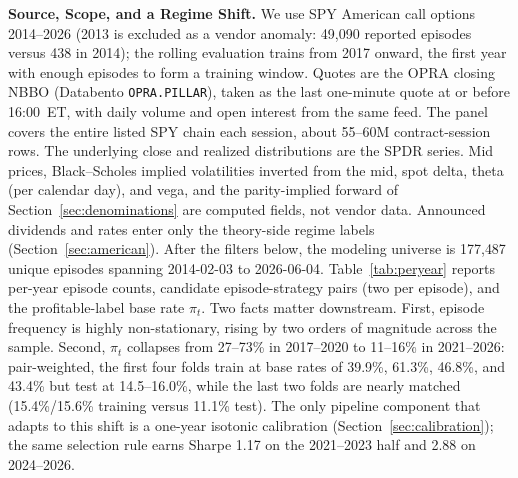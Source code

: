 \documentclass[sigconf,review,anonymous]{acmart}
\begin{document}
\medskip\noindent\textbf{Source, Scope, and a Regime Shift.}
\label{sec:data-source}
We use SPY American call options 2014--2026 (2013 is excluded as a vendor anomaly: 49{,}090 reported episodes versus 438 in 2014); the rolling evaluation trains from 2017 onward, the first year with enough episodes to form a training window. Quotes are the OPRA closing NBBO (Databento \texttt{OPRA.PILLAR}), taken as the last one-minute quote at or before 16:00~ET, with daily volume and open interest from the same feed. The panel covers the entire listed SPY chain each session, about 55--60M contract-session rows. The underlying close and realized distributions are the SPDR series. Mid prices, Black--Scholes implied volatilities inverted from the mid, spot delta, theta (per calendar day), and vega, and the parity-implied forward of Section~\ref{sec:denominations} are computed fields, not vendor data. Announced dividends and rates enter only the theory-side regime labels (Section~\ref{sec:american}). After the filters below, the modeling universe is 177{,}487 unique episodes spanning 2014-02-03 to 2026-06-04. Table~\ref{tab:peryear} reports per-year episode counts, candidate episode-strategy pairs (two per episode), and the profitable-label base rate $\pi_t$. Two facts matter downstream. First, episode frequency is highly non-stationary, rising by two orders of magnitude across the sample. Second, $\pi_t$ collapses from 27--73\% in 2017--2020 to 11--16\% in 2021--2026: pair-weighted, the first four folds train at base rates of 39.9\%, 61.3\%, 46.8\%, and 43.4\% but test at 14.5--16.0\%, while the last two folds are nearly matched (15.4\%/15.6\% training versus 11.1\% test). The only pipeline component that adapts to this shift is a one-year isotonic calibration (Section~\ref{sec:calibration}); the same selection rule earns Sharpe 1.17 on the 2021--2023 half and 2.88 on 2024--2026.
\end{document}
